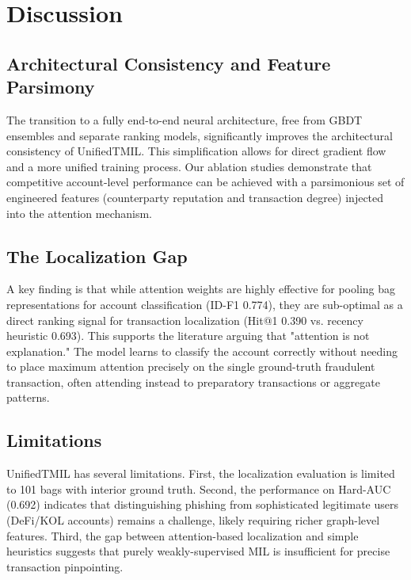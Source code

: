 \documentclass[conference]{IEEEtran}
\begin{document}
\section{Discussion}

\subsection{Architectural Consistency and Feature Parsimony}
The transition to a fully end-to-end neural architecture, free from GBDT ensembles and separate ranking models, significantly improves the architectural consistency of UnifiedTMIL. This simplification allows for direct gradient flow and a more unified training process. Our ablation studies demonstrate that competitive account-level performance can be achieved with a parsimonious set of engineered features (counterparty reputation and transaction degree) injected into the attention mechanism.

\subsection{The Localization Gap}
A key finding is that while attention weights are highly effective for pooling bag representations for account classification (ID-F1 0.774), they are sub-optimal as a direct ranking signal for transaction localization (Hit@1 0.390 vs. recency heuristic 0.693). This supports the literature \cite{jain2019} arguing that "attention is not explanation." The model learns to classify the account correctly without needing to place maximum attention precisely on the single ground-truth fraudulent transaction, often attending instead to preparatory transactions or aggregate patterns.

\subsection{Limitations}
UnifiedTMIL has several limitations. First, the localization evaluation is limited to 101 bags with interior ground truth. Second, the performance on Hard-AUC (0.692) indicates that distinguishing phishing from sophisticated legitimate users (DeFi/KOL accounts) remains a challenge, likely requiring richer graph-level features. Third, the gap between attention-based localization and simple heuristics suggests that purely weakly-supervised MIL is insufficient for precise transaction pinpointing.
\end{document}
